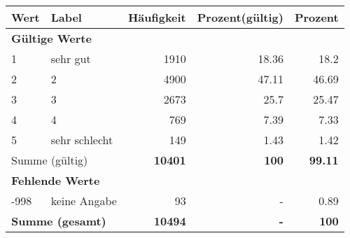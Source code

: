      \begin{longtable}{lXrrr}
     \toprule
     \textbf{Wert} & \textbf{Label} & \textbf{Häufigkeit} & \textbf{Prozent(gültig)} & \textbf{Prozent} \\
     \endhead
     \midrule
     \multicolumn{5}{l}{\textbf{Gültige Werte}}\\

     1 &
     \multicolumn{1}{X}{ sehr gut   } &


       \num{1910} &
       \num[round-mode=places,round-precision=2]{18.36} &
         \num[round-mode=places,round-precision=2]{18.2} \\

     2 &
     \multicolumn{1}{X}{ 2   } &


       \num{4900} &
       \num[round-mode=places,round-precision=2]{47.11} &
         \num[round-mode=places,round-precision=2]{46.69} \\

     3 &
     \multicolumn{1}{X}{ 3   } &


       \num{2673} &
       \num[round-mode=places,round-precision=2]{25.7} &
         \num[round-mode=places,round-precision=2]{25.47} \\

     4 &
     \multicolumn{1}{X}{ 4   } &


       \num{769} &
       \num[round-mode=places,round-precision=2]{7.39} &
         \num[round-mode=places,round-precision=2]{7.33} \\

     5 &
     \multicolumn{1}{X}{ sehr schlecht   } &


       \num{149} &
       \num[round-mode=places,round-precision=2]{1.43} &
         \num[round-mode=places,round-precision=2]{1.42} \\
     \midrule
     \multicolumn{2}{l}{Summe (gültig)} &
       \textbf{\num{10401}} &
     \textbf{\num{100}} &
       \textbf{\num[round-mode=places,round-precision=2]{99.11}} \\
     \multicolumn{5}{l}{\textbf{Fehlende Werte}}\\
       -998 &
       keine Angabe &
         \num{93} &
        - &
         \num[round-mode=places,round-precision=2]{0.89} \\
     \midrule
     \multicolumn{2}{l}{\textbf{Summe (gesamt)}} &
          \textbf{\num{10494}} &
        \textbf{-} &
        \textbf{\num{100}} \\
     \bottomrule
     \end{longtable}
     
